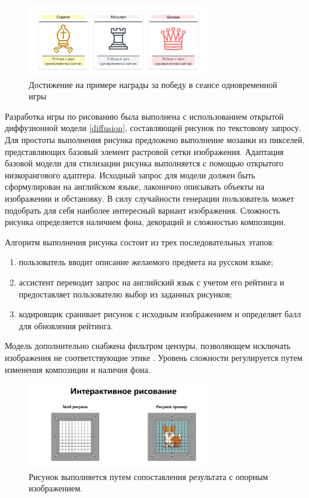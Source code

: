 \begin{figure}[h]
    \centering
    \includegraphics[width=0.7\textwidth]{assets/work/games/achieve.png}
    \caption{Достижение на примере награды за победу в сеансе одновременной игры}
    \label{achievement}
\end{figure}

Разработка игры по рисованию была выполнена с использованием открытой диффузионной модели \ref{diffusion},
составляющей рисунок по текстовому запросу. Для простоты выполнения рисунка предложено выполнение мозаики из
пикселей, представляющих базовый элемент растровой сетки изображения. Адаптация базовой модели для стилизации
рисунка выполняется с помощью открытого низкорангового адаптера. Исходный запрос для модели должен быть 
сформулирован на английском языке, лаконично описывать объекты на изображении и обстановку. 
В силу случайности генерации пользователь может подобрать для себя наиболее интересный вариант изображения.
Сложность рисунка определяется наличием фона, декораций и сложностью композиции. 

Алгоритм выполнения рисунка состоит из трех последовательных этапов:
\begin{enumerate}
    \item пользователь вводит описание желаемого предмета на русском языке;
    \item ассистент переводит запрос на английский язык с учетом его рейтинга и предоставляет пользователю выбор из заданных рисунков;
    \item кодировщик сранивает рисунок с исходным изображением и определяет балл для обновления рейтинга.
\end{enumerate}

Модель дополнительно снабжена фильтром цензуры, позволяющем исключать изображения не соответствующие этике \cite{radford2021learning}.
Уровень сложности регулируется путем изменения композиции и наличия фона.
\begin{figure}[h]
    \centering
    \includegraphics[width=0.7\textwidth]{assets/work/games/draw.excalidraw.png}
    \caption{Рисунок выполняется путем сопоставления результата с опорным изображением.}
    \label{draw}
\end{figure}
